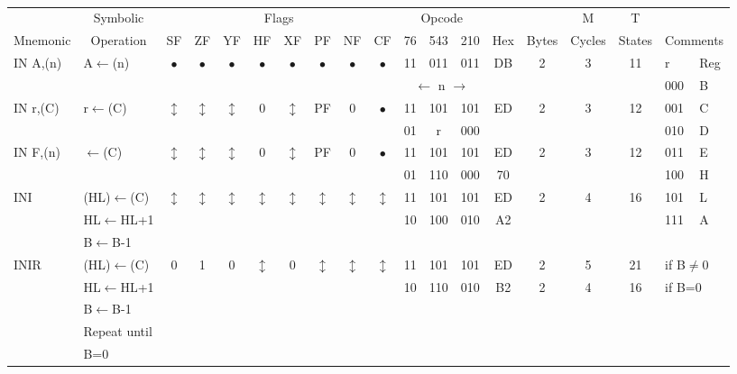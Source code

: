 \documentclass[oneside,a4paper]{book}
\begin{document}
{\tt \scriptsize \setlength{\fboxsep}{0.25mm}
\setlength{\tabcolsep}{1mm}
\begin{tabular}{llc@{ }c@{ }c@{ }c@{ }c@{ }c@{ }c@{ }cc@{ }c@{ }cccccll}\hline
 & \multicolumn{1}{c}{Symbolic} & \multicolumn{8}{c}{Flags} & \multicolumn{3}{c}{Opcode} & & & M & T & \\
Mnemonic & \multicolumn{1}{c}{Operation} & SF & ZF & YF & HF & XF & PF & NF & CF & 76 & 543 & 210 
	& Hex & Bytes & Cycles & States & \multicolumn{2}{l}{Comments} \\ \hline

IN A,(n) & A$\leftarrow$(n) & 
	$\bullet$ & $\bullet$ & $\bullet$ & $\bullet$ & $\bullet$ & $\bullet$ & $\bullet$ & $\bullet$ & 11 & 011 & 011 
	& DB & 2 & 3 & 11 & r & Reg \\ \cline{18-19}
	& &  \multicolumn{8}{c}{} & \multicolumn{3}{c}{$\leftarrow$ n $\rightarrow$} & & & &  & 000 & B \\

IN r,(C) & r$\leftarrow$(C) & 
	$\updownarrow$ & $\updownarrow$ & $\updownarrow$ & 0 & $\updownarrow$ & PF & 0 & $\bullet$ & 11 & 101 & 101 
	& ED & 2 & 3 & 12 & 001 & C \\
	& & \multicolumn{8}{c}{} & 01 & r & 000  & & & &  & 010 & D \\

IN F,(n) & $\leftarrow$(C) & 
	$\updownarrow$ & $\updownarrow$ & $\updownarrow$ & 0 & $\updownarrow$ & PF & 0 & $\bullet$ & 11 & 101 & 101 
	& ED & 2 & 3 & 12 & 011 & E \\
	& & \multicolumn{8}{c}{} & 01 & 110 & 000 & 70 & & &  & 100 & H \\

INI & (HL)$\leftarrow$(C) & 
	$\updownarrow$\footnotemark[1] & $\updownarrow$\footnotemark[1] & $\updownarrow$\footnotemark[1] & $\updownarrow$\footnotemark[3] & 
	$\updownarrow$\footnotemark[1] & $\updownarrow$\footnotemark[3] & $\updownarrow$\footnotemark[2] & $\updownarrow$\footnotemark[3] & 11 & 101 & 101 
	& ED & 2 & 4 & 16 & 101 & L \\
	& HL$\leftarrow$HL+1 & \multicolumn{8}{c}{} & 10 & 100 & 010 & A2 & & &  & 111 & A \\
	& B$\leftarrow$B-1 \\

INIR & (HL)$\leftarrow$(C) & 
	0 & 1 & 0 & $\updownarrow$\footnotemark[3] & 0 & $\updownarrow$\footnotemark[3] & $\updownarrow$\footnotemark[2] & $\updownarrow$\footnotemark[3] & 11 & 101 & 101 
	& ED & 2 & 5 & 21 & \multicolumn{2}{l}{if B$\not=$0} \\
	& HL$\leftarrow$HL+1 & \multicolumn{8}{c}{} & 10 & 110 & 010 & B2 & 2 & 4 & 16 & \multicolumn{2}{l}{if B=0} \\
	& B$\leftarrow$B-1 \\
	& Repeat until \\
	& B=0 \\


\end{tabular}}
\end{document}
